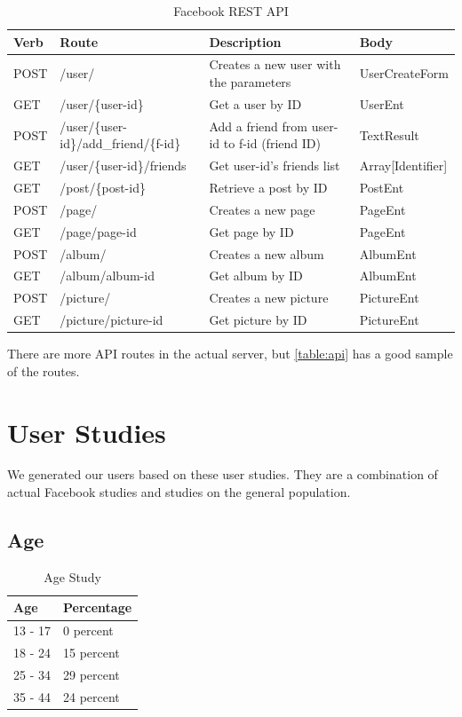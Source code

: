 \documentclass{article}
\begin{document}
\begin{table}[H]
\centering
\begin{tabular}{|p{1cm}|p{5.5cm}|p{5.5cm}|p{2.53cm}|} 
 \hline
 Verb  & Route & Description  & Body\\ [0.5ex] \hline\hline
 POST  & /user/ & Creates a new user with the parameters & UserCreateForm\\ \hline
 GET & /user/\{user-id\} & Get a user by ID & UserEnt \\ \hline
 POST & /user/\{user-id\}/add\_friend/\{f-id\} & Add a friend from user-id to f-id (friend ID) & TextResult \\ \hline
 GET & /user/\{user-id\}/friends & Get user-id's friends list & Array[Identifier] \\ \hline
 GET & /post/\{post-id\} & Retrieve a post by ID  & PostEnt \\ [1ex] \hline
 POST & /page/ & Creates a new page & PageEnt \\ [1ex] \hline
 GET & /page/{page-id} & Get page by ID & PageEnt \\ [1ex] \hline
 POST & /album/ & Creates a new album & AlbumEnt \\ [1ex] \hline
 GET & /album/{album-id} & Get album by ID & AlbumEnt \\ [1ex] \hline
 POST & /picture/ & Creates a new picture & PictureEnt \\ [1ex] \hline
 GET & /picture/{picture-id} & Get picture by ID & PictureEnt \\ [1ex] \hline
\end{tabular}
\caption{Facebook REST API}
\label{table:api}
\end{table}

There are more API routes in the actual server, but \autoref{table:api} has a good sample of the routes.

\section*{User Studies}
We generated our users based on these user studies. They are a combination of actual Facebook studies and studies on the general population.

\subsection*{Age}
\begin{table}[H]
\centering
\begin{tabular}{|p{2cm}||p{2cm}|} 
 \hline
 Age & Percentage \\ [0.5ex] 
 \hline\hline
 13 - 17 & 0 percent \\
 \hline
 18 - 24 & 15 percent \\
 \hline
 25 - 34 & 29 percent \\
 \hline
 35 - 44 & 24 percent \\ [1ex] 
 \hline
\end{tabular}
\caption{Age Study \cite{sproutsocialwebsite}}
\label{table:1}
\end{table}
\end{document}
